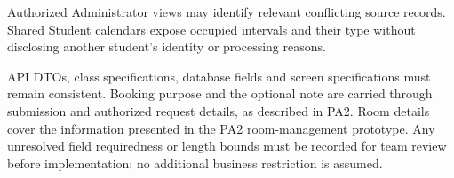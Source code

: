 Authorized Administrator views may identify relevant conflicting source records. Shared Student calendars expose occupied intervals and their type without disclosing another student's identity or processing reasons.\par

API DTOs, class specifications, database fields and screen specifications must remain consistent. Booking purpose and the optional note are carried through submission and authorized request details, as described in PA2. Room details cover the information presented in the PA2 room-management prototype. Any unresolved field requiredness or length bounds must be recorded for team review before implementation; no additional business restriction is assumed.\par